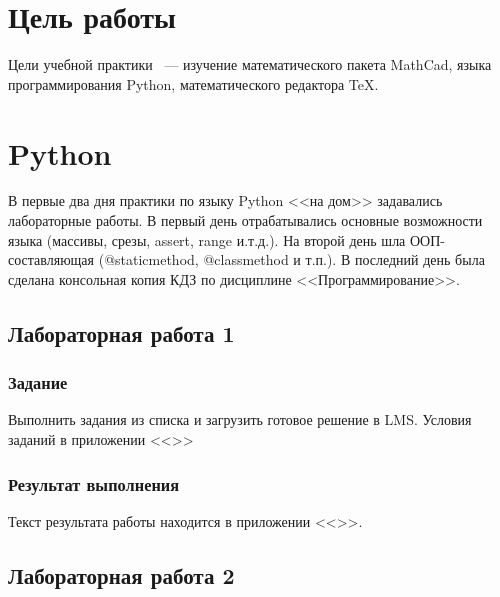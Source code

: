 \documentclass[a4paper,12pt]{article}
\def \includeDir {src/}
\begin{document}


\tableofcontents

\newpage
\section{Цель работы}
Цели учебной практики ~--- изучение математического пакета MathCad, языка 
программирования Python, математического редактора TeX.

\newpage
\section{Python}
\label{sec:python}
В первые два дня практики по языку Python <<на дом>> задавались лабораторные работы. В первый день отрабатывались основные возможности языка (массивы, срезы, assert, range и.т.д.). На второй день шла ООП-составляющая (@staticmethod, @classmethod и т.п.). В последний день была сделана консольная копия КДЗ по дисциплине <<Программирование>>.
\subsection{Лабораторная работа 1}
\subsubsection{Задание}
Выполнить задания из списка и загрузить готовое решение в LMS. Условия заданий в приложении <<>>

\subsubsection{Результат выполнения}
Текст результата работы находится в приложении <<>>.\\

\subsection{Лабораторная работа 2}
\end{document}
